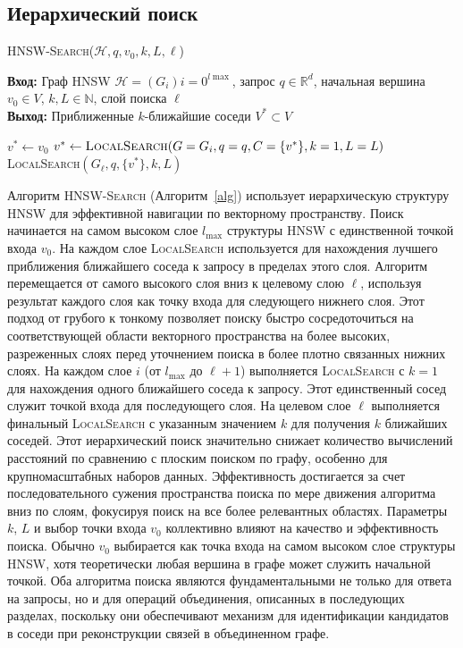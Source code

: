 \documentclass{article}
\begin{document}
\subsection{Иерархический поиск}
\begin{algorithm}
\caption{\textsc{HNSW-Search}($\mathcal{H}, q, v_0, k, L, \ell$)}\label{alg}
\textbf{Вход:} Граф HNSW $\mathcal{H} = (G_i){i=0}^{l{\max}}$, запрос $q \in \mathbb{R}^d$, начальная вершина $v_0 \in V$, $k, L \in \mathbb{N}$, слой поиска $\ell$ \\
\textbf{Выход:} Приближенные $k$-ближайшие соседи $V^* \subset V$
\begin{algorithmic}[1]
\State $v^* \gets v_0$
\State $v^* \gets \textsc{LocalSearch} (G=G_i, q=q, C=\{v^*\}, k=1, L=L)$
\EndFor
\State \Return \textsc{LocalSearch}$(G_\ell, q, \{v^*\}, k, L)$
\end{algorithmic}
\end{algorithm}
Алгоритм \textsc{HNSW-Search} (Алгоритм~\ref{alg}) использует иерархическую структуру HNSW для эффективной навигации по векторному пространству. Поиск начинается на самом высоком слое $l_{\max}$ структуры HNSW с единственной точкой входа $v_0$. На каждом слое \textsc{LocalSearch} используется для нахождения лучшего приближения ближайшего соседа к запросу в пределах этого слоя.
Алгоритм перемещается от самого высокого слоя вниз к целевому слою $\ell$, используя результат каждого слоя как точку входа для следующего нижнего слоя. Этот подход от грубого к тонкому позволяет поиску быстро сосредоточиться на соответствующей области векторного пространства на более высоких, разреженных слоях перед уточнением поиска в более плотно связанных нижних слоях.
На каждом слое $i$ (от $l_{\max}$ до $\ell+1$) выполняется \textsc{LocalSearch} с $k=1$ для нахождения одного ближайшего соседа к запросу. Этот единственный сосед служит точкой входа для последующего слоя. На целевом слое $\ell$ выполняется финальный \textsc{LocalSearch} с указанным значением $k$ для получения $k$ ближайших соседей.
Этот иерархический поиск значительно снижает количество вычислений расстояний по сравнению с плоским поиском по графу, особенно для крупномасштабных наборов данных. Эффективность достигается за счет последовательного сужения пространства поиска по мере движения алгоритма вниз по слоям, фокусируя поиск на все более релевантных областях.
Параметры $k$, $L$ и выбор точки входа $v_0$ коллективно влияют на качество и эффективность поиска. Обычно $v_0$ выбирается как точка входа на самом высоком слое структуры HNSW, хотя теоретически любая вершина в графе может служить начальной точкой.
Оба алгоритма поиска являются фундаментальными не только для ответа на запросы, но и для операций объединения, описанных в последующих разделах, поскольку они обеспечивают механизм для идентификации кандидатов в соседи при реконструкции связей в объединенном графе.
\end{document}
